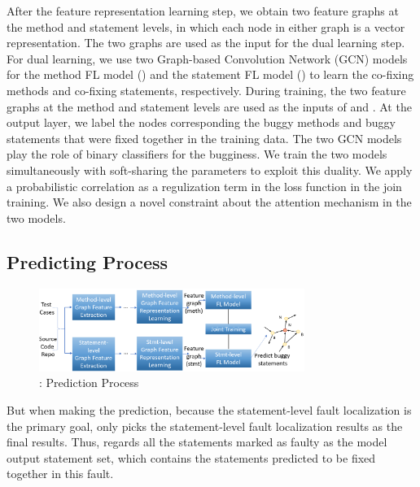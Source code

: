 After the feature representation learning step, we obtain two feature
graphs at the method and statement levels, in which each node in
either graph is a vector representation. The two graphs are used as
the input for the dual learning step. For dual learning, we use two
Graph-based Convolution Network (GCN) models~\cite{kipf2016semi} for
the method FL model () and the statement FL model
() to learn the co-fixing methods and co-fixing
statements, respectively. During training, the two feature graphs at
the method and statement levels are used as the inputs of
 and . At the output layer, we label the
nodes corresponding the buggy methods and buggy statements that were
fixed together in the training data. The two GCN models play the role
of binary classifiers for the bugginess.
%
We train the two models simultaneously with soft-sharing the
parameters to exploit this duality. We apply a probabilistic
correlation as a regulization term in the loss function in the join
training. We also design a novel constraint about the attention
mechanism in the two models.



\subsection{Predicting Process}

\begin{figure}[t]
	\centering
	\includegraphics[width=3.4in]{graphs/overview-predict.png}
	\caption{{\tool}: Prediction Process}
	\label{predict-overview}
\end{figure}


But when making the prediction, because the statement-level fault
localization is the primary goal, \tool only picks the statement-level
fault localization results as the final results. Thus, \tool regards
all the statements marked as faulty as the model output statement set,
which contains the statements predicted to be fixed together in this
fault.
